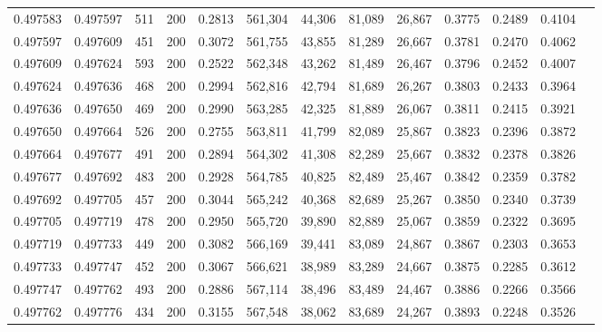 \begin{tabular}{rrrrrrrrrrrrr}
0.497583 & 0.497597 &   511 & 200 &                                     0.2813 & 561,304 &  44,306 &  81,089 &  26,867 & 0.3775 & 0.2489 & 0.4104 \\
0.497597 & 0.497609 &   451 & 200 &                                     0.3072 & 561,755 &  43,855 &  81,289 &  26,667 & 0.3781 & 0.2470 & 0.4062 \\
0.497609 & 0.497624 &   593 & 200 &                                     0.2522 & 562,348 &  43,262 &  81,489 &  26,467 & 0.3796 & 0.2452 & 0.4007 \\
0.497624 & 0.497636 &   468 & 200 &                                     0.2994 & 562,816 &  42,794 &  81,689 &  26,267 & 0.3803 & 0.2433 & 0.3964 \\
0.497636 & 0.497650 &   469 & 200 &                                     0.2990 & 563,285 &  42,325 &  81,889 &  26,067 & 0.3811 & 0.2415 & 0.3921 \\
0.497650 & 0.497664 &   526 & 200 &                                     0.2755 & 563,811 &  41,799 &  82,089 &  25,867 & 0.3823 & 0.2396 & 0.3872 \\
0.497664 & 0.497677 &   491 & 200 &                                     0.2894 & 564,302 &  41,308 &  82,289 &  25,667 & 0.3832 & 0.2378 & 0.3826 \\
0.497677 & 0.497692 &   483 & 200 &                                     0.2928 & 564,785 &  40,825 &  82,489 &  25,467 & 0.3842 & 0.2359 & 0.3782 \\
0.497692 & 0.497705 &   457 & 200 &                                     0.3044 & 565,242 &  40,368 &  82,689 &  25,267 & 0.3850 & 0.2340 & 0.3739 \\
0.497705 & 0.497719 &   478 & 200 &                                     0.2950 & 565,720 &  39,890 &  82,889 &  25,067 & 0.3859 & 0.2322 & 0.3695 \\
0.497719 & 0.497733 &   449 & 200 &                                     0.3082 & 566,169 &  39,441 &  83,089 &  24,867 & 0.3867 & 0.2303 & 0.3653 \\
0.497733 & 0.497747 &   452 & 200 &                                     0.3067 & 566,621 &  38,989 &  83,289 &  24,667 & 0.3875 & 0.2285 & 0.3612 \\
0.497747 & 0.497762 &   493 & 200 &                                     0.2886 & 567,114 &  38,496 &  83,489 &  24,467 & 0.3886 & 0.2266 & 0.3566 \\
0.497762 & 0.497776 &   434 & 200 &                                     0.3155 & 567,548 &  38,062 &  83,689 &  24,267 & 0.3893 & 0.2248 & 0.3526 \\

\end{tabular}
